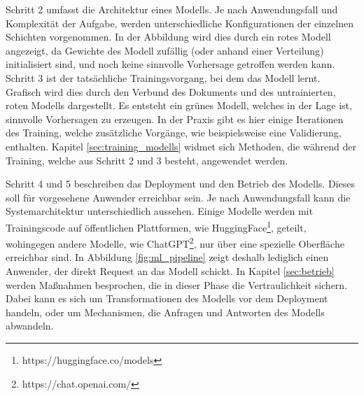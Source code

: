 Schritt 2 umfasst die Architektur eines Modells.
Je nach Anwendungsfall und Komplexität der Aufgabe, werden unterschiedliche Konfigurationen der einzelnen Schichten vorgenommen.
In der Abbildung wird dies durch ein rotes Modell angezeigt, da Gewichte des Modell zufällig (oder anhand einer Verteilung) initialisiert sind, und noch keine sinnvolle Vorhersage getroffen werden kann.
Schritt 3 ist der tatsächliche Trainingsvorgang, bei dem das Modell lernt.
Grafisch wird dies durch den Verbund des Dokuments und des untrainierten, roten Modells dargestellt. 
Es entsteht ein grünes Modell, welches in der Lage ist, sinnvolle Vorhersagen zu erzeugen.
In der Praxis gibt es hier einige Iterationen des Training, welche zusätzliche Vorgänge, wie beispielsweise eine Validierung, enthalten. 
Kapitel \ref{sec:training_modells} widmet sich Methoden, die während der Training, welche aus Schritt 2 und 3 besteht, angewendet werden.

Schritt 4 und 5 beschreiben das Deployment und den Betrieb des Modells. 
Dieses soll für vorgesehene Anwender erreichbar sein. 
Je nach Anwendungsfall kann die Systemarchitektur unterschiedlich aussehen. 
Einige Modelle werden mit Trainingscode auf öffentlichen Plattformen, wie HuggingFace\footnote{https://huggingface.co/models}, geteilt, wohingegen andere Modelle, wie ChatGPT\footnote{https://chat.openai.com/}, nur über eine spezielle Oberfläche erreichbar sind.
In Abbildung \ref{fig:ml_pipeline} zeigt deshalb lediglich einen Anwender, der direkt Request an das Modell schickt.
In Kapitel \ref{sec:betrieb} werden Maßnahmen besprochen, die in dieser Phase die Vertraulichkeit sichern. 
Dabei kann es sich um Transformationen des Modells vor dem Deployment handeln, oder um Mechanismen, die Anfragen und Antworten des Modells abwandeln.